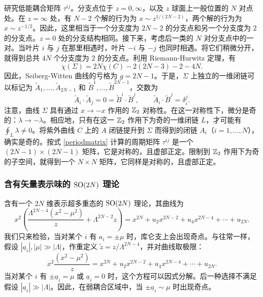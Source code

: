 研究低能耦合矩阵 $\tau^{ij}$。分支点位于 $z=0,\infty$，以及 $z$ 球面上一般位置的 $N$ 对点处。在 $z=\infty$ 处，有 $N-2$ 个解的行为为 $x\sim z^{1/(2N-2)}$，两个解的行为为 $x\sim z^{-1/2}$。因此，这里相当于一个分支度为 $2N-2$ 的分支点和另一个分支度为 $2$ 的分支点。$z=0$ 处的分支结构相同。接下来，考虑后一类的 $N$ 对分支点中的一对。当叶片 $i$ 与 $j$ 在那里相遇时，叶片 $-i$ 与 $-j$ 也同时相遇。将它们稍微分开，就得到总共 $4N$ 个分支度为 $2$ 的分支点。利用 Riemann-Hurwitz 定理，有
\begin{equation}
\chi(\Sigma)=2N\chi(C)-2(2N-3)-2-4N.
\end{equation}
因此，Seiberg-Witten 曲线的亏格为 $g=2N-1$。于是，$\Sigma$ 上独立的一维闭链可以标记为 $\tilde A_1,\ldots,\tilde A_{2N-1}$ 和 $\tilde B^1,\ldots,\tilde B^{2N-1}$，交数为
\begin{equation}
\tilde A_i\cdot\tilde A_j=0=\tilde B^i\cdot\tilde B^j,\qquad
\tilde A_i\cdot\tilde B^j=\delta_i^j.
\end{equation}
注意，曲线 $\Sigma$ 具有通过 $x\to-x$ 作用的 $\mathbb{Z}_2$ 对称性。在这一对称性下，微分是奇的：$\lambda\to-\lambda$。相应地，只有在这一 $\mathbb{Z}_2$ 作用下为奇的一维闭链 $L$，才可能有 $\oint_L\lambda\neq0$。将紫外曲线 $C$ 上的 $A$ 闭链提升到 $\Sigma$ 而得到的闭链 $A_i$（$i=1,\ldots,N$），确实是奇的。按式 \eqref{periodmatrix} 计算的周期矩阵 $\tau^{ij}$ 是一个 $(2N-1)\times(2N-1)$ 矩阵，它是对称的，且虚部正定。限制到 $\mathbb{Z}_2$ 作用下为奇的子空间，就得到一个 $N\times N$ 矩阵，它同样是对称的，且虚部正定。

\subsubsection{含有矢量表示味的 $\mathop{\mathrm{SO}}(2N)$ 理论}
含有一个 $2N$ 维表示超多重态的 $\mathop{\mathrm{SO}}(2N)$ 理论，其曲线为
\begin{equation}
x^2(\frac{\Lambda^{2N-4}(x^2-\mu^2)}z+\Lambda^{2N-2}z)
=x^{2N}+u_2x^{2N-2}+u_4x^{2N-4}+\cdots+u_{2N}.
\end{equation}
我们只来检验，当对某个 $i$ 有 $a_i=\pm\mu$ 时，库仑支上会出现奇点。与往常一样，假设 $|\underline a_i|,|\mu|\gg|\Lambda|$，作重定义 $\tilde z=z/\Lambda^{2N-4}$，并对曲线取极限：
\begin{equation}
x^2\frac{(x^2-\mu^2)}z
=x^{2N}+u_2x^{2N-2}+u_4x^{2N-4}+\cdots+u_{2N}.
\end{equation}
当对某个 $i$ 有 $\pm\underline a_i=\mu$ 或 $\underline a_i=0$ 时，这个方程可以因式分解。后一种选择不满足假设 $|\underline a_i|\gg|\Lambda|$。因此，在弱耦合区域中，当 $\pm\underline a_i\sim\mu$ 时出现奇点。

